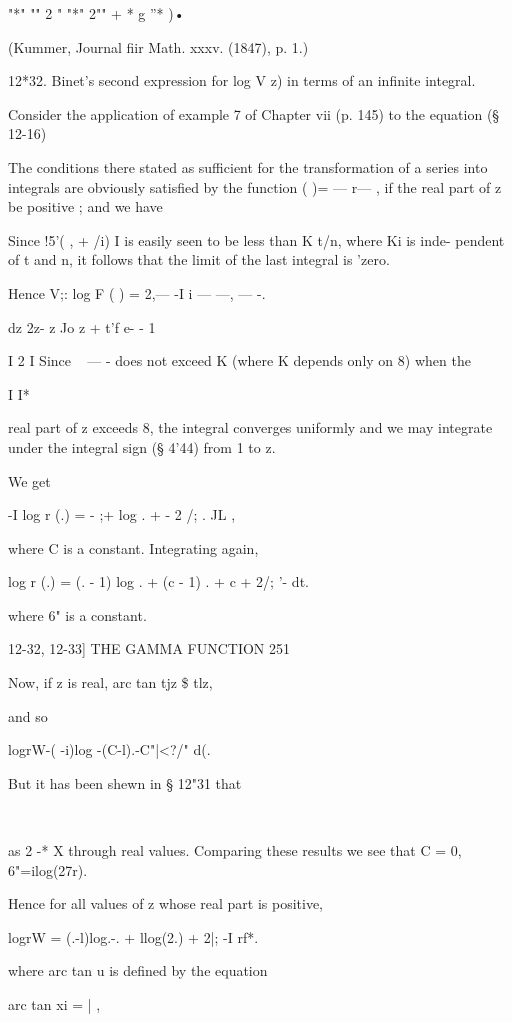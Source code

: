 "*" "" 2 " "*" 2"" + * g ''* )•

(Kummer, Journal fiir Math. xxxv. (1847), p. 1.)

12*32. Binet's second expression for log V z) in terms of an infinite
integral.

Consider the application of example 7 of Chapter vii (p. 145) to the
equation (§ 12-16)

The conditions there stated as sufficient for the transformation of a
series into integrals are obviously satisfied by the function ( )= —
r— , if the real part of z be positive ; and we have

Since !5'( , + /i) I is easily seen to be less than K t/n, where Ki is
inde- pendent of t and n, it follows that the limit of the last
integral is 'zero.

Hence V;: log F ( ) = 2,— -I i — —, — -.

dz 2z- z Jo z + t'f e- - 1

I 2 I Since ~ — - does not exceed K (where K depends only on 8) when
the

I I*

real part of z exceeds 8, the integral converges uniformly and we may
integrate under the integral sign (§ 4'44) from 1 to z.

We get

-I log r (.) = - ;+ log . + - 2 /; . JL ,

where C is a constant. Integrating again,

log r (.) = (. - 1) log . + (c - 1) . + c + 2/; '- dt.

where 6" is a constant.



12-32, 12-33] THE GAMMA FUNCTION 251

Now, if z is real, arc tan tjz \$ tlz,

and so

logrW-( -i)log -(C-l).-C"|<?/" d(.

But it has been shewn in § 12"31 that

\ \ %

as 2 -* X through real values. Comparing these results we see that C =
0, 6"=ilog(27r).

Hence for all values of z whose real part is positive,

logrW = (.-l)log.-. + llog(2.) + 2|; -I rf*.

where arc tan u is defined by the equation

arc tan xi = | ,

